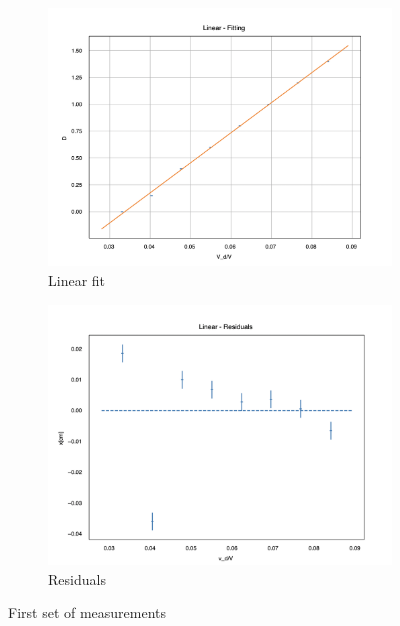 \documentclass[12pt]{article}
\begin{document}
\begin{figure}[H]
  \centering
  \begin{subfigure}[b]{0.45\textwidth}
    \includegraphics[width=\textwidth]{Electric measurments/first set fit.png}
    \caption{Linear fit}
    \label{fig:first_set_fit}
  \end{subfigure}\hfill
  \begin{subfigure}[b]{0.45\textwidth}
    \includegraphics[width=\textwidth]{Electric measurments/first set residual.png}
    \caption{Residuals}
    \label{fig:first_set_residual}
  \end{subfigure}
  \caption{First set of measurements}
  \label{fig:first_set}
\end{figure}
\end{document}
